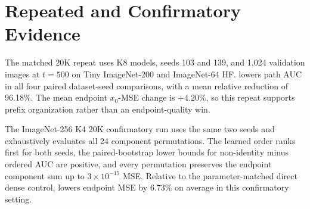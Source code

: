 \section{Repeated and Confirmatory Evidence}

The matched 20K repeat uses K8 models, seeds 103 and 139, and 1,024 validation
images at $t=500$ on Tiny ImageNet-200 and ImageNet-64 HF. \method{} lowers path
AUC in all four paired dataset-seed comparisons, with a mean relative reduction
of 96.18\%. The mean endpoint $x_0$-MSE change is $+4.20\%$, so this repeat
supports prefix organization rather than an endpoint-quality win.

The ImageNet-256 K4 20K confirmatory run uses the same two seeds and exhaustively
evaluates all 24 component permutations. The learned order ranks first for both
seeds, the paired-bootstrap lower bounds for non-identity minus ordered AUC are
positive, and every permutation preserves the endpoint component sum up to
$3\times10^{-15}$ MSE. Relative to the parameter-matched direct dense control,
\method{} lowers endpoint MSE by 6.73\% on average in this confirmatory setting.
